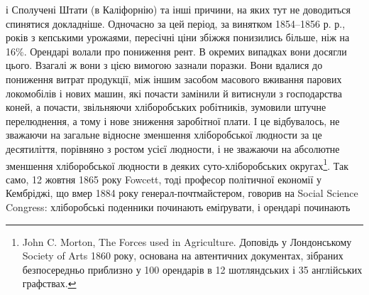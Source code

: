 і Сполучені Штати (в Каліфорнію) та інші причини, на яких тут не доводиться
спинятися докладніше. Одночасно за цей період, за винятком 1854--1856 р. р., років
з кепськими урожаями, пересічні ціни збіжжя понизились більше, ніж на 16\%.
Орендарі волали про пониження рент. В окремих випадках вони досягли цього.
Взагалі ж вони з цією вимогою зазнали поразки. Вони вдалися до пониження
витрат продукції, між іншим засобом масового вживання парових
локомобілів і нових машин, які почасти замінили й витиснули з господарства
коней, а почасти, звільняючи хліборобських робітників, зумовили
штучне перелюднення, а тому і нове зниження заробітної плати. І це відбувалось,
не зважаючи на загальне відносне зменшення хліборобської людности за це
десятиліття, порівняно з ростом усієї людности, і не зважаючи на абсолютне зменшення
хліборобської людности в деяких суто-хліборобських округах\footnote{
John C. Morton, The Forces used in Agriculture. Доповідь у Лондонському Society of Arts 1860
року, основана на автентичних документах, зібраних безпосередньо приблизно у 100 орендарів в 12
шотляндських і 35 англійських графствах.
}. Так
само, 12 жовтня 1865 року Fowcett, тоді професор політичної економії у Кембріджі,
що вмер 1884 року генерал-почтмайстером, говорив на Social Science
Congress: хліборобські поденники починають еміґрувати, і орендарі починають
\parbreak{}  %
